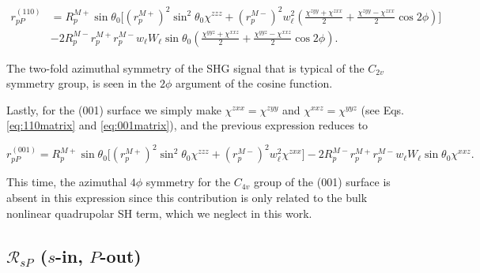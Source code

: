 \documentclass[aps,prb,10pt,showpacs,letterpaper,twocolumn]{revtex4-1}
\begin{document}
\begin{widetext}
\begin{equation}\label{eq:rpp110}
\begin{split}
r^{(110)}_{pP} &= 
R^{M+}_{p}\sin\theta_{0}
\Bigg[
  \left(r^{M+}_{p}\right)^{2}\sin^{2}\theta_{0}\chi^{zzz}
+ \left(r^{M-}_{p}\right)^{2}w^{2}_{\ell}
\left(
\frac{\chi^{zyy} + \chi^{zxx}}{2} + \frac{\chi^{zyy} - \chi^{zxx}}{2}\cos2\phi 
\right) 
\Bigg]\\
&- 2R^{M-}_{p}r^{M+}_{p}r^{M-}_{p}w_{\ell}W_{\ell}\sin\theta_{0}
\left(
\frac{\chi^{yyz} + \chi^{xxz}}{2} + \frac{\chi^{yyz} - \chi^{xxz}}{2}\cos2\phi 
\right). 
\end{split}
\end{equation}
\end{widetext}
The two-fold azimuthal symmetry of the SHG signal that is typical of the
$C_{2v}$ symmetry group, is seen in the $2\phi$ argument of the cosine function.
{\color{red}
Lastly, for the (001) surface we simply make $\chi^{zxx} = \chi^{zyy}$ and
$\chi^{xxz} = \chi^{yyz}$ (see Eqs. \eqref{eq:110matrix} and
\eqref{eq:001matrix}), and the previous expression reduces to
\begin{widetext}
\begin{equation}\label{rpp001}
r^{(001)}_{pP} = 
R^{M+}_{p}\sin\theta_{0}
\bigg[
  \left(r^{M+}_{p}\right)^{2}\sin^{2}\theta_{0}\chi^{zzz}
+ \left(r^{M-}_{p}\right)^{2}w^{2}_{\ell}\chi^{zxx}
\bigg]
- 2R^{M-}_{p}r^{M+}_{p}r^{M-}_{p}w_{\ell}W_{\ell}\sin\theta_{0}\chi^{xxz}.
\end{equation}
\end{widetext}
}
This time, the azimuthal $4\phi$ symmetry for the $C_{4v}$ group of the (001)
surface is absent in this  expression since this contribution is only related to
the bulk nonlinear quadrupolar SH term,\cite{sipePRB87} which we neglect in this
work.



\subsection{\texorpdfstring{$\mathcal{R}_{sP}$ ($s$-in, $P$-out)} {RsP (s-in,
P-out)}}
\label{sec:RsP}
\end{document}
